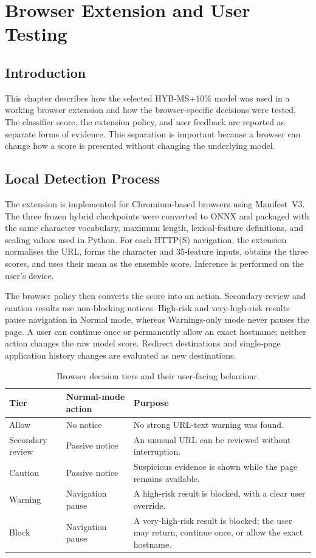 \chapter{Browser Extension and User Testing}
\label{chap:browser-extension}

\section{Introduction}

This chapter describes how the selected HYB-MS+10\% model was used in a
working browser extension and how the browser-specific decisions were tested.
The classifier score, the extension policy, and user feedback are reported as
separate forms of evidence. This separation is important because a browser can
change how a score is presented without changing the underlying model.

\section{Local Detection Process}

The extension is implemented for Chromium-based browsers using Manifest~V3.
The three frozen hybrid checkpoints were converted to ONNX and packaged with
the same character vocabulary, maximum length, lexical-feature definitions,
and scaling values used in Python. For each HTTP(S) navigation, the extension
normalises the URL, forms the character and 35-feature inputs, obtains the
three scores, and uses their mean as the ensemble score. Inference is performed
on the user's device.

The browser policy then converts the score into an action. Secondary-review
and caution results use non-blocking notices. High-risk and very-high-risk
results pause navigation in Normal mode, whereas Warnings-only mode never
pauses the page. A user can continue once or permanently allow an exact
hostname; neither action changes the raw model score. Redirect destinations
and single-page application history changes are evaluated as new destinations.

\begin{table}[htbp]
\centering
\caption{Browser decision tiers and their user-facing behaviour.}
\label{tab:browser-tiers}
\small
\begin{tabular}{@{}p{}p{}p{}@{}}
\toprule
Tier & Normal-mode action & Purpose \\
\midrule
Allow & No notice & No strong URL-text warning was found. \\
Secondary review & Passive notice & An unusual URL can be reviewed without interruption. \\
Caution & Passive notice & Suspicious evidence is shown while the page remains available. \\
Warning & Navigation pause & A high-risk result is blocked, with a clear user override. \\
Block & Navigation pause & A very-high-risk result is blocked; the user may return, continue once, or allow the exact hostname. \\
\bottomrule
\end{tabular}
\end{table}

